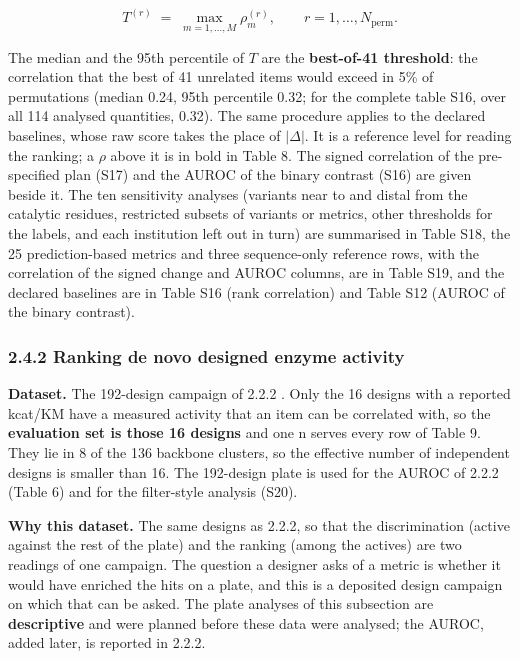 \documentclass[
  10pt,
]{article}
\DeclareRobustCommand{\_}{\textunderscore\hspace{0pt}}
\begin{document}
\begin{equation*}T^{(r)} \;=\; \max_{m = 1,\dots,M} \rho^{(r)}_{m}, \qquad r = 1,\dots,N_{\mathrm{perm}} . \tag{14}\end{equation*}

The median and the
95th percentile of
\(T\) are the
\textbf{best-of-41
threshold}: the
correlation that the
best of 41 unrelated
items would exceed
in 5\% of
permutations (median
0.24, 95th
percentile 0.32; for
the complete table
S16, over all 114
analysed quantities,
0.32). The same
procedure applies to
the declared
baselines, whose raw
score takes the
place of
\(\lvert\Delta\rvert\).
It is a reference
level for reading
the ranking; a
\(\rho\) above it is
in bold in Table 8.
The signed
correlation of the
pre-specified plan
(S17) and the AUROC
of the binary
contrast (S16) are
given beside it. The
ten sensitivity
analyses (variants
near to and distal
from the catalytic
residues, restricted
subsets of variants
or metrics, other
thresholds for the
labels, and each
institution left out
in turn) are
summarised in Table
S18, the 25
prediction-based
metrics and three
sequence-only
reference rows, with
the correlation of
the signed change
and AUROC columns,
are in Table S19,
and the declared
baselines are in
Table S16 (rank
correlation) and
Table S12 (AUROC of
the binary
contrast).

\subsubsection{2.4.2
Ranking de novo
designed enzyme
activity}

\textbf{Dataset.}
The 192-design
campaign of 2.2.2
\cite{kim2026}. Only
the 16 designs with
a reported kcat/KM
have a measured
activity that an
item can be
correlated with, so
the
\textbf{evaluation
set is those 16
designs} and one n
serves every row of
Table 9. They lie in
8 of the 136
backbone clusters,
so the effective
number of
independent designs
is smaller than 16.
The 192-design plate
is used for the
AUROC of 2.2.2
(Table 6) and for
the filter-style
analysis (S20).

\textbf{Why this
dataset.} The same
designs as 2.2.2, so
that the
discrimination
(active against the
rest of the plate)
and the ranking
(among the actives)
are two readings of
one campaign. The
question a designer
asks of a metric is
whether it would
have enriched the
hits on a plate, and
this is a deposited
design campaign on
which that can be
asked. The plate
analyses of this
subsection are
\textbf{descriptive}
and were planned
before these data
were analysed; the
AUROC, added later,
is reported in
2.2.2.
\end{document}
